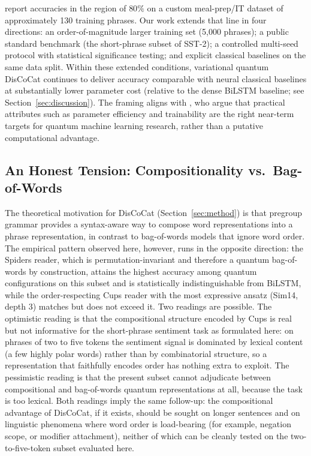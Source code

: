 \documentclass[11pt, a4paper]{article}
\begin{document}
\citet{lorenz2021} report accuracies in the region of \(80\%\) on a
custom meal-prep/IT dataset of approximately 130 training phrases.
Our work extends that line in four directions: an
order-of-magnitude larger training set (5{,}000 phrases); a public
standard benchmark (the short-phrase subset of SST-2); a controlled
multi-seed protocol with statistical significance testing; and
explicit classical baselines on the same data split. Within these
extended conditions, variational quantum DisCoCat continues to
deliver accuracy comparable with neural classical baselines at
substantially lower parameter cost (relative to the dense BiLSTM
baseline; see Section~\ref{sec:discussion}). The framing aligns with
\citet{schuld2022advantage}, who argue that practical attributes such
as parameter efficiency and trainability are the right near-term
targets for quantum machine learning research, rather than a putative
computational advantage.

\subsection{An Honest Tension: Compositionality vs.\ Bag-of-Words}

The theoretical motivation for DisCoCat (Section~\ref{sec:method}) is
that pregroup grammar provides a syntax-aware way to compose word
representations into a phrase representation, in contrast to
bag-of-words models that ignore word order. The empirical pattern
observed here, however, runs in the opposite direction: the Spiders
reader, which is permutation-invariant and therefore a quantum
bag-of-words by construction, attains the highest accuracy among
quantum configurations on this subset and is statistically
indistinguishable from BiLSTM, while the order-respecting Cups
reader with the most expressive ansatz (Sim14, depth 3) matches but
does not exceed it. Two readings are possible. The optimistic
reading is that the compositional structure encoded by Cups is real
but not informative for the short-phrase sentiment task as
formulated here: on phrases of two to five tokens the sentiment
signal is dominated by lexical content (a few highly polar words)
rather than by combinatorial structure, so a representation that
faithfully encodes order has nothing extra to exploit. The
pessimistic reading is that the present subset cannot adjudicate
between compositional and bag-of-words quantum representations at
all, because the task is too lexical. Both readings imply the same
follow-up: the compositional advantage of DisCoCat, if it exists,
should be sought on longer sentences and on linguistic phenomena
where word order is load-bearing (for example, negation scope, or
modifier attachment), neither of which can be cleanly tested on the
two-to-five-token subset evaluated here.
\end{document}
